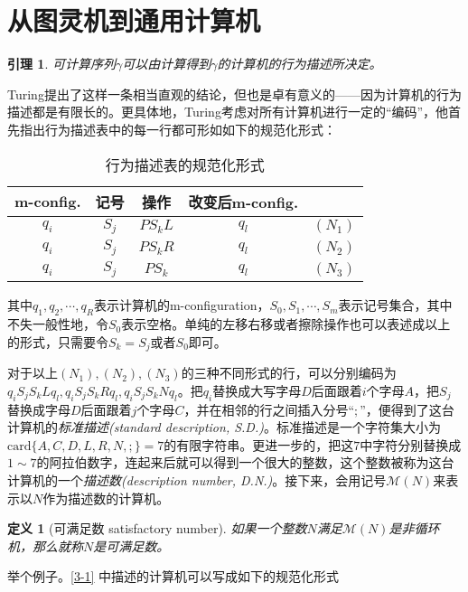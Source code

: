 \documentclass[8pt]{article}
\newtheorem{lemma}{引理}
\newtheorem{definition}{定义}
\begin{document}
\section{从图灵机到通用计算机}

\begin{lemma}
	可计算序列$\gamma$可以由计算得到$\gamma$的计算机的行为描述所决定。
\end{lemma}

Turing提出了这样一条相当直观的结论，但也是卓有意义的——因为计算机的行为描述都是有限长的。更具体地，Turing考虑对所有计算机进行一定的“编码”，他首先指出行为描述表中的每一行都可形如如下的规范化形式：
\begin{table}[h]
	\centering
	\begin{tabular}{ccccc}
		m-config. & 记号 & 操作 & 改变后m-config. &\\
		\hline
		$q_i$ & $S_j$ & $PS_kL$ & $q_l$ & $(N_1)$ \\
		$q_i$ & $S_j$ & $PS_kR$ & $q_l$ & $(N_2)$ \\
		$q_i$ & $S_j$ & $PS_k$ & $q_l$ & $(N_3)$ \\
	\end{tabular}
	\caption{行为描述表的规范化形式}
	\label{uniform}
\end{table}

其中$q_1, q_2, \cdots, q_R$表示计算机的m-configuration，$S_0, S_1, \cdots, S_m$表示记号集合，其中不失一般性地，令$S_0$表示空格。单纯的左移右移或者擦除操作也可以表述成以上的形式，只需要令$S_k = S_j$或者$S_0$即可。

对于以上$(N_1), (N_2), (N_3)$的三种不同形式的行，可以分别编码为$q_iS_jS_kLq_l, q_iS_jS_kRq_l, q_iS_jS_kNq_l$。把$q_i$替换成大写字母$D$后面跟着$i$个字母$A$，把$S_j$替换成字母$D$后面跟着$j$个字母$C$，并在相邻的行之间插入分号“$;$”，便得到了这台计算机的\textit{标准描述(standard description, S.D.)}。标准描述是一个字符集大小为$\text{card}\{A, C, D, L, R, N, ;\} = 7$的有限字符串。更进一步的，把这$7$中字符分别替换成$1\sim 7$的阿拉伯数字，连起来后就可以得到一个很大的整数，这个整数被称为这台计算机的一个\textit{描述数(description number, D.N.)}。接下来，会用记号$\mathcal M(N)$来表示以$N$作为描述数的计算机。

\begin{definition}[可满足数 satisfactory number]
	如果一个整数$N$满足$\mathcal M(N)$是非循环机，那么就称$N$是可满足数。
\end{definition}

举个例子。\cref{3-1} 中描述的计算机可以写成如下的规范化形式
\end{document}
